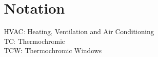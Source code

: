 \section{Notation}
HVAC: Heating, Ventilation and Air Conditioning\\
TC: Thermochromic\\
TCW: Thermochromic Windows\\

